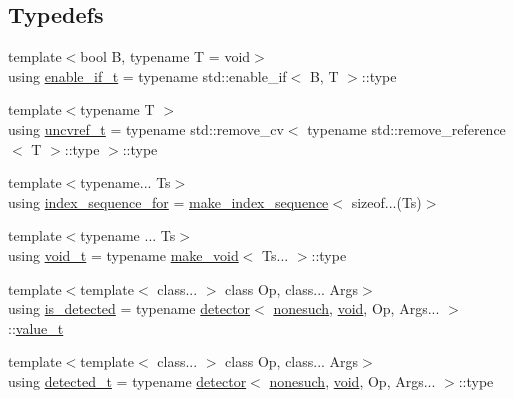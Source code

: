 \subsection*{Typedefs}
\begin{DoxyCompactItemize}
\item 
{\footnotesize template$<$bool B, typename T  = void$>$ }\\using \mbox{\hyperlink{namespacenlohmann_1_1detail_a02bcbc878bee413f25b985ada771aa9c}{enable\+\_\+if\+\_\+t}} = typename std\+::enable\+\_\+if$<$ B, T $>$\+::type
\item 
{\footnotesize template$<$typename T $>$ }\\using \mbox{\hyperlink{namespacenlohmann_1_1detail_a53a082eedad9f4729fcd8fed552a21f7}{uncvref\+\_\+t}} = typename std\+::remove\+\_\+cv$<$ typename std\+::remove\+\_\+reference$<$ T $>$\+::type $>$\+::type
\item 
{\footnotesize template$<$typename... Ts$>$ }\\using \mbox{\hyperlink{namespacenlohmann_1_1detail_a24800493c6ec02ce033dcbb47b7fd28e}{index\+\_\+sequence\+\_\+for}} = \mbox{\hyperlink{structnlohmann_1_1detail_1_1make__index__sequence}{make\+\_\+index\+\_\+sequence}}$<$ sizeof...(Ts)$>$
\item 
{\footnotesize template$<$typename ... Ts$>$ }\\using \mbox{\hyperlink{namespacenlohmann_1_1detail_a92a167c49c6697b6ffe4f79492c705e5}{void\+\_\+t}} = typename \mbox{\hyperlink{structnlohmann_1_1detail_1_1make__void}{make\+\_\+void}}$<$ Ts... $>$\+::type
\item 
{\footnotesize template$<$template$<$ class... $>$ class Op, class... Args$>$ }\\using \mbox{\hyperlink{namespacenlohmann_1_1detail_a9135fcf616d6ac6e231a86e0a055ac44}{is\+\_\+detected}} = typename \mbox{\hyperlink{structnlohmann_1_1detail_1_1detector}{detector}}$<$ \mbox{\hyperlink{structnlohmann_1_1detail_1_1nonesuch}{nonesuch}}, \mbox{\hyperlink{namespacenlohmann_1_1detail_a59fca69799f6b9e366710cb9043aa77d}{void}}, Op, Args... $>$\+::\mbox{\hyperlink{namespacenlohmann_1_1detail_a1ed8fc6239da25abcaf681d30ace4985}{value\+\_\+t}}
\item 
{\footnotesize template$<$template$<$ class... $>$ class Op, class... Args$>$ }\\using \mbox{\hyperlink{namespacenlohmann_1_1detail_a37e97a32d0b94ce5f745427e4e40204d}{detected\+\_\+t}} = typename \mbox{\hyperlink{structnlohmann_1_1detail_1_1detector}{detector}}$<$ \mbox{\hyperlink{structnlohmann_1_1detail_1_1nonesuch}{nonesuch}}, \mbox{\hyperlink{namespacenlohmann_1_1detail_a59fca69799f6b9e366710cb9043aa77d}{void}}, Op, Args... $>$\+::type

\end{DoxyCompactItemize}
